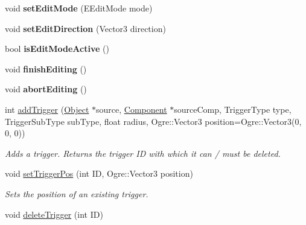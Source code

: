 \begin{DoxyCompactItemize}
\item 
\hypertarget{classObjectManager_a1548324710faf79c8e6e19ac80a8cb99}{
void {\bfseries set\-Edit\-Mode} (\-E\-Edit\-Mode mode)}
\label{d6/d6f/classObjectManager_a1548324710faf79c8e6e19ac80a8cb99}

\item 
\hypertarget{classObjectManager_a2e8a17b64dacd40e354581b1866e4071}{
void {\bfseries set\-Edit\-Direction} (\-Vector3 direction)}
\label{d6/d6f/classObjectManager_a2e8a17b64dacd40e354581b1866e4071}

\item 
\hypertarget{classObjectManager_a0cd4bc362bb95aed2e85ed1bd812064a}{
bool {\bfseries is\-Edit\-Mode\-Active} ()}
\label{d6/d6f/classObjectManager_a0cd4bc362bb95aed2e85ed1bd812064a}

\item 
\hypertarget{classObjectManager_a5c2b46719b9a82dde5e27a9b848ba170}{
void {\bfseries finish\-Editing} ()}
\label{d6/d6f/classObjectManager_a5c2b46719b9a82dde5e27a9b848ba170}

\item 
\hypertarget{classObjectManager_ad1b8185fe4f4d70615ceabcd9fda33a1}{
void {\bfseries abort\-Editing} ()}
\label{d6/d6f/classObjectManager_ad1b8185fe4f4d70615ceabcd9fda33a1}

\item 
\hypertarget{classObjectManager_ad1e07f4f04454fec14b623a7fe0e7ef1}{
int \hyperlink{classObjectManager_ad1e07f4f04454fec14b623a7fe0e7ef1}{add\-Trigger} (\hyperlink{classObject}{\-Object} $\ast$source, \hyperlink{classComponent}{\-Component} $\ast$source\-Comp, \-Trigger\-Type type, \-Trigger\-Sub\-Type sub\-Type, float radius, \-Ogre\-::\-Vector3 position=\-Ogre\-::\-Vector3(0, 0, 0))}
\label{d6/d6f/classObjectManager_ad1e07f4f04454fec14b623a7fe0e7ef1}

\begin{DoxyCompactList}\small\item\em \-Adds a trigger. \-Returns the trigger \-I\-D with which it can / must be deleted. \end{DoxyCompactList}\item 
\hypertarget{classObjectManager_ae2bb176bb4705bc5711e048b0724a3e2}{
void \hyperlink{classObjectManager_ae2bb176bb4705bc5711e048b0724a3e2}{set\-Trigger\-Pos} (int \-I\-D, \-Ogre\-::\-Vector3 position)}
\label{d6/d6f/classObjectManager_ae2bb176bb4705bc5711e048b0724a3e2}

\begin{DoxyCompactList}\small\item\em \-Sets the position of an existing trigger. \end{DoxyCompactList}\item 
\hypertarget{classObjectManager_a747b67428e3b8141ad0d98e92becf1bb}{
void \hyperlink{classObjectManager_a747b67428e3b8141ad0d98e92becf1bb}{delete\-Trigger} (int \-I\-D)}
\label{d6/d6f/classObjectManager_a747b67428e3b8141ad0d98e92becf1bb}


\end{DoxyCompactItemize}
